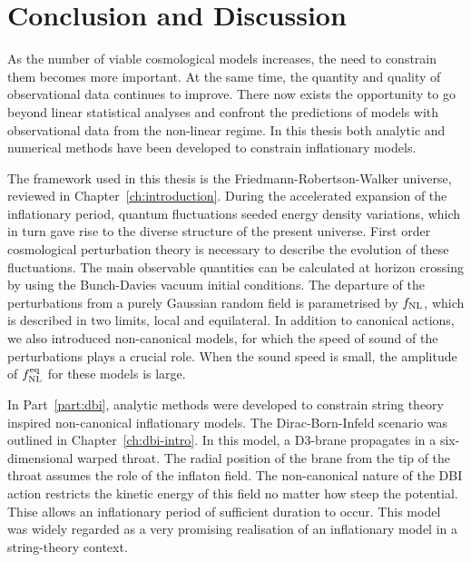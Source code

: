 \renewcommand{\CVSrevision}%
{\version$Id: theend.tex,v 1.15 2009/11/20 14:24:21 ith Exp $}

\chapter{Conclusion and Discussion}
\label{ch:conclusions}

As the number of viable cosmological models increases, the need to constrain them becomes more
important. At the same time, the quantity and quality of observational data continues to improve.
There now exists the opportunity to go beyond linear statistical analyses
and confront the predictions of models with observational data from the non-linear
regime. In this thesis both analytic and numerical methods have been developed to
constrain inflationary models.

The framework used in this thesis is the Friedmann-Robertson-Walker universe,
reviewed in Chapter~\ref{ch:introduction}. During the accelerated expansion of the
inflationary period, quantum fluctuations seeded energy density variations, which in turn
gave rise to the diverse structure of the present universe. First order
cosmological perturbation theory
is necessary to describe the evolution of these fluctuations. The main observable
quantities can be calculated at horizon crossing by using the Bunch-Davies vacuum
initial conditions. The departure of the perturbations from a purely Gaussian random
field is parametrised by $f_{\mathrm{NL}}$, which is described in two limits, local and
equilateral. 
In addition to canonical actions, we also introduced
non-canonical models, for which the speed of sound of the perturbations plays a
crucial role. When the sound speed is small, the amplitude of $f_{\mathrm{NL}}^{\mathrm{eq}}$ for these
models is large. 



In Part~\ref{part:dbi}, analytic methods were developed to constrain
string theory inspired non-canonical inflationary models. The Dirac-Born-Infeld
scenario was
outlined in Chapter~\ref{ch:dbi-intro}. In this model, a D3-brane propagates in a
six-dimensional warped throat. The radial position of the brane from the tip of the
throat assumes the role of the inflaton field. The non-canonical nature of the DBI
action restricts the kinetic energy of this field no matter how steep the potential.
Thise allows an inflationary period of sufficient duration to occur.
This model was widely regarded as a very promising realisation of an inflationary
model in a string-theory context.


